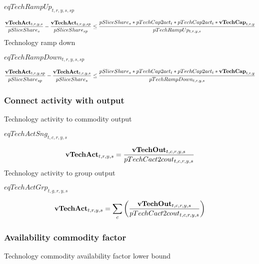 \documentclass{article}
\begin{document}
$eqTechRampUp_{t,r,y,s,sp}$





\begin{dmath}
\frac{{\bf vTechAct}_{t,r,y,s}}{pSliceShare_{s}}-\frac{{\bf vTechAct}_{t,r,y,sp}}{pSliceShare_{sp}}  \le  \frac{pSliceShare_{s}*pTechCap2act_{t}*pTechCap2act_{t}*{\bf vTechCap}_{t,r,y}}{pTechRampUp_{t,r,y,s}}
\end{dmath}
Technology ramp down







$eqTechRampDown_{t,r,y,s,sp}$





\begin{dmath}
\frac{{\bf vTechAct}_{t,r,y,sp}}{pSliceShare_{sp}}-\frac{{\bf vTechAct}_{t,r,y,s}}{pSliceShare_{s}}  \le  \frac{pSliceShare_{s}*pTechCap2act_{t}*pTechCap2act_{t}*{\bf vTechCap}_{t,r,y}}{pTechRampDown_{t,r,y,s}}
\end{dmath}
\subsubsection*{Connect activity with output}
Technology activity to commodity output







$eqTechActSng_{t,c,r,y,s}$





\begin{dmath}
{\bf vTechAct}_{t,r,y,s}  =  \frac{{\bf vTechOut}_{t,c,r,y,s}}{pTechCact2cout_{t,c,r,y,s}}
\end{dmath}
Technology activity to group output







$eqTechActGrp_{t,g,r,y,s}$





\begin{dmath}
{\bf vTechAct}_{t,r,y,s}  =  \sum_{c}{\left(\frac{{\bf vTechOut}_{t,c,r,y,s}}{pTechCact2cout_{t,c,r,y,s}}\right)}
\end{dmath}
\subsubsection*{Availability commodity factor}
Technology commodity availability factor lower bound
\end{document}
